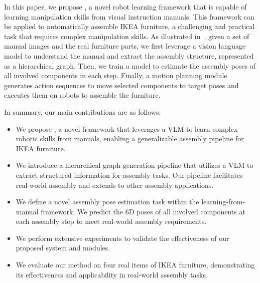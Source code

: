 In this paper, we propose \ours, a novel robot learning framework that is capable of learning manipulation skills from visual instruction manuals.
This framework can be applied to automatically assemble IKEA furniture, a challenging and practical task that requires complex manipulation skills.
As illustrated in~, given a set of manual images and the real furniture parts, we first leverage a vision language model to understand the manual and extract the assembly structure, represented as a hierarchical graph.
Then, we train a model to estimate the assembly poses of all involved components in each step.
Finally, a motion planning module generates action sequences to move selected components to target poses and executes them on robots to assemble the furniture.

In summary, our main contributions are as follows:
\begin{itemize}
    \item We propose \ours, a novel framework that leverages a VLM to learn complex robotic skills from manuals, enabling a generalizable assembly pipeline for IKEA furniture.
    \item We introduce a hierarchical graph generation pipeline that utilizes a VLM to extract structured information for assembly tasks. Our pipeline facilitates real-world assembly and extends to other assembly applications.
    \item We define a novel assembly pose estimation task within the learning-from-manual framework. We predict the 6D poses of all involved components at each assembly step to meet real-world assembly requirements.
    \item We perform extensive experiments to validate the effectiveness of our proposed system and modules.
    \item We evaluate our method on four real items of IKEA furniture, demonstrating its effectiveness and applicability in real-world assembly tasks.
\end{itemize}



